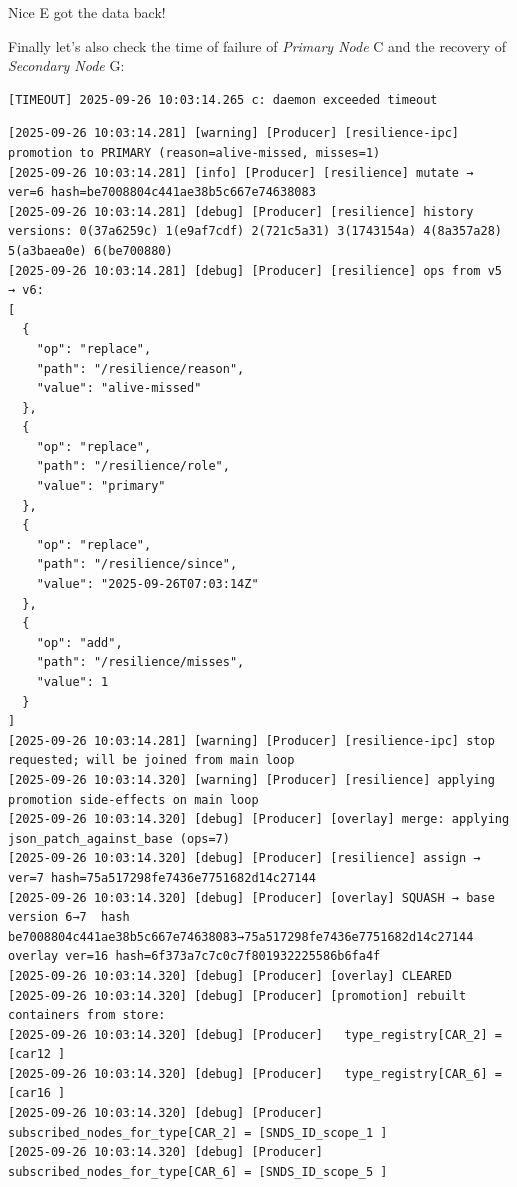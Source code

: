 \documentclass{article}
\begin{document}
Nice E got the data back!

Finally let's also check the time of failure of \emph{Primary Node} C and the recovery of \emph{Secondary Node} G:

\begin{lstlisting}[language=log, caption={Timeout of Node C}, label={lst:timeout-node-c}]
[TIMEOUT] 2025-09-26 10:03:14.265 c: daemon exceeded timeout 
\end{lstlisting}

\begin{lstlisting}[language=log, caption={Recovery of Node C through Node G}, label={lst:recovery-of-node-c-g}]
[2025-09-26 10:03:14.281] [warning] [Producer] [resilience-ipc] promotion to PRIMARY (reason=alive-missed, misses=1)
[2025-09-26 10:03:14.281] [info] [Producer] [resilience] mutate → ver=6 hash=be7008804c441ae38b5c667e74638083
[2025-09-26 10:03:14.281] [debug] [Producer] [resilience] history versions: 0(37a6259c) 1(e9af7cdf) 2(721c5a31) 3(1743154a) 4(8a357a28) 5(a3baea0e) 6(be700880) 
[2025-09-26 10:03:14.281] [debug] [Producer] [resilience] ops from v5 → v6:
[
  {
    "op": "replace",
    "path": "/resilience/reason",
    "value": "alive-missed"
  },
  {
    "op": "replace",
    "path": "/resilience/role",
    "value": "primary"
  },
  {
    "op": "replace",
    "path": "/resilience/since",
    "value": "2025-09-26T07:03:14Z"
  },
  {
    "op": "add",
    "path": "/resilience/misses",
    "value": 1
  }
]
[2025-09-26 10:03:14.281] [warning] [Producer] [resilience-ipc] stop requested; will be joined from main loop
[2025-09-26 10:03:14.320] [warning] [Producer] [resilience] applying promotion side-effects on main loop
[2025-09-26 10:03:14.320] [debug] [Producer] [overlay] merge: applying json_patch_against_base (ops=7)
[2025-09-26 10:03:14.320] [debug] [Producer] [resilience] assign → ver=7 hash=75a517298fe7436e7751682d14c27144
[2025-09-26 10:03:14.320] [debug] [Producer] [overlay] SQUASH → base version 6→7  hash be7008804c441ae38b5c667e74638083→75a517298fe7436e7751682d14c27144  overlay ver=16 hash=6f373a7c7c0c7f801932225586b6fa4f
[2025-09-26 10:03:14.320] [debug] [Producer] [overlay] CLEARED
[2025-09-26 10:03:14.320] [debug] [Producer] [promotion] rebuilt containers from store:
[2025-09-26 10:03:14.320] [debug] [Producer]   type_registry[CAR_2] = [car12 ]
[2025-09-26 10:03:14.320] [debug] [Producer]   type_registry[CAR_6] = [car16 ]
[2025-09-26 10:03:14.320] [debug] [Producer]   subscribed_nodes_for_type[CAR_2] = [SNDS_ID_scope_1 ]
[2025-09-26 10:03:14.320] [debug] [Producer]   subscribed_nodes_for_type[CAR_6] = [SNDS_ID_scope_5 ]

\end{lstlisting}
\end{document}
